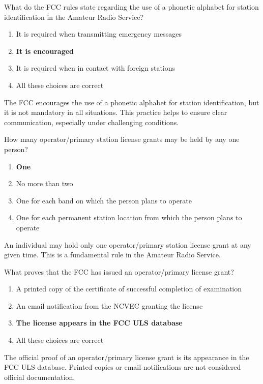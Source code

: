 \begin{tcolorbox}[colback=gray!10!white,colframe=black!75!black,title={T1A03}]
    What do the FCC rules state regarding the use of a phonetic alphabet for station identification in the Amateur Radio Service?
    \begin{enumerate}[label=\Alph*,noitemsep]
        \item It is required when transmitting emergency messages
        \item \textbf{It is encouraged}
        \item It is required when in contact with foreign stations
        \item All these choices are correct
    \end{enumerate}
\end{tcolorbox}
The FCC encourages the use of a phonetic alphabet for station identification, but it is not mandatory in all situations. This practice helps to ensure clear communication, especially under challenging conditions.


\begin{tcolorbox}[colback=gray!10!white,colframe=black!75!black,title={T1A04}]
    How many operator/primary station license grants may be held by any one person?
    \begin{enumerate}[label=\Alph*,noitemsep]
        \item \textbf{One}
        \item No more than two
        \item One for each band on which the person plans to operate
        \item One for each permanent station location from which the person plans to operate
    \end{enumerate}
\end{tcolorbox}
An individual may hold only one operator/primary station license grant at any given time. This is a fundamental rule in the Amateur Radio Service.


\begin{tcolorbox}[colback=gray!10!white,colframe=black!75!black,title={T1A05}]
    What proves that the FCC has issued an operator/primary license grant?
    \begin{enumerate}[label=\Alph*,noitemsep]
        \item A printed copy of the certificate of successful completion of examination
        \item An email notification from the NCVEC granting the license
        \item \textbf{The license appears in the FCC ULS database}
        \item All these choices are correct
    \end{enumerate}
\end{tcolorbox}
The official proof of an operator/primary license grant is its appearance in the FCC ULS database. Printed copies or email notifications are not considered official documentation.

